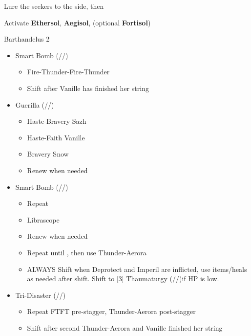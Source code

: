 \begin{multicols}{2}
Lure the seekers to the side, then 
\end{multicols}
Activate \textbf{Ethersol}, \textbf{Aegisol}, (optional \textbf{Fortisol})
\renewcommand{\first}{[1] Guerilla (\syn/\rav/\sab)}
\renewcommand{\second}{[2] Tri-Disaster (\rav/\rav/\rav)}
\renewcommand{\third}{[3] Thaumaturgy (\rav/\rav/\med)}
\renewcommand{\fourth}{[4] Tireless Charge (\com/\com/\med)}
\renewcommand{\fifth}{[5] Smart Bomb (\rav/\rav/\sab)}
\renewcommand{\sixth}{[6] Aggression (\com/\com/\rav)}
\begin{battle}{Barthandelus 2}
\begin{multicols}{2}
\begin{itemize}
    \item \fifth
    \begin{itemize}
        \item Fire-Thunder-Fire-Thunder
        \item Shift after Vanille has finished her string
    \end{itemize}
    \item \first
    \begin{itemize}
        \item Haste-Bravery Sazh
        \item Haste-Faith Vanille
        \item Bravery Snow
        \item Renew when needed
    \end{itemize}
    \item \fifth
    \begin{itemize}
        \item Repeat
        \item Librascope
        \item Renew when needed
        \item Repeat until \stagger, then use Thunder-Aerora
        \item ALWAYS Shift when Deprotect and Imperil are inflicted, use items/heals as needed after shift. Shift to \third if HP is low.
    \end{itemize}
    \item \second
    \begin{itemize}
        \item Repeat FTFT pre-stagger, Thunder-Aerora post-stagger
        \item Shift after second Thunder-Aerora and Vanille finished her string

\end{itemize}
\end{itemize}
\end{multicols}
\end{battle}
